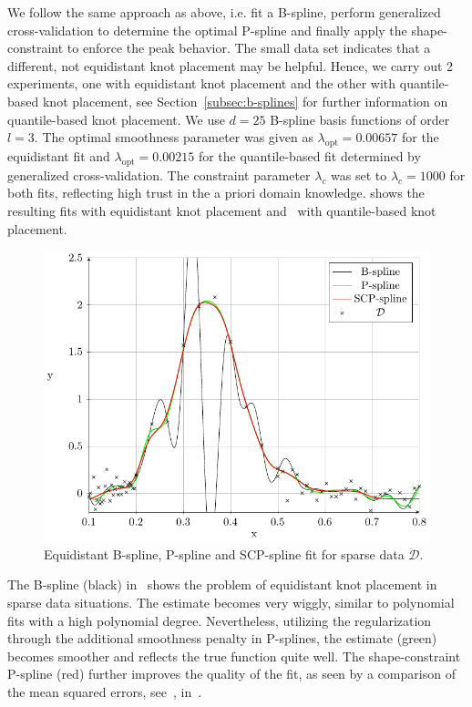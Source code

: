 We follow the same approach as above, i.e. fit a B-spline, perform generalized cross-validation to determine the optimal P-spline and finally apply the shape-constraint to enforce the peak behavior. The small data set indicates that a different, not equidistant knot placement may be helpful. Hence, we carry out 2 experiments, one with equidistant knot placement and the other with quantile-based knot placement, see Section~\ref{subsec:b-splines} for further information on quantile-based knot placement. We use $d=25$ B-spline basis functions of order $l=3$. The optimal smoothness parameter was given as $\lambda_{\mathrm{opt}} = 0.00657$ for the equidistant fit and $\lambda_{\mathrm{opt}} = 0.00215$ for the quantile-based fit determined by generalized cross-validation. The constraint parameter $\lambda_c$ was set to $\lambda_c=1000$ for both fits, reflecting high trust in the a priori domain knowledge.  shows the resulting fits with equidistant knot placement and~ with quantile-based knot placement.


\begin{figure}[H]
	\centering
	\includegraphics{graphics/pgfplots/cha4/exp-sparse-equidistant.pdf}
	\caption{Equidistant B-spline, P-spline and SCP-spline fit for sparse data $\mathcal{D}$.}
	\label{fig:sparse-example-equidistant}
\end{figure}

The B-spline (black) in~ shows the problem of equidistant knot placement in sparse data situations. The estimate becomes very wiggly, similar to polynomial fits with a high polynomial degree. Nevertheless, utilizing the regularization through the additional smoothness penalty in P-splines, the estimate (green) becomes smoother and reflects the true function quite well. The shape-constraint P-spline (red) further improves the quality of the fit, as seen by a comparison of the mean squared errors,  see~, in~. 

